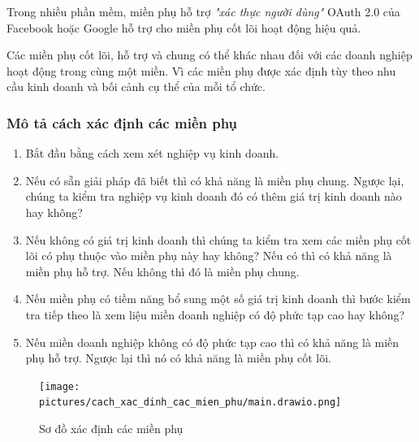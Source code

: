 \begin{example} Trong nhiều phần mềm, miền phụ hỗ trợ \textit{"xác thực người dùng"} OAuth 2.0 của Facebook hoặc Google hỗ trợ cho miền phụ cốt lõi hoạt động hiệu quả.

\end{example}


Các miền phụ cốt lõi, hỗ trợ và chung có thể khác nhau đối với các doanh nghiệp hoạt động trong cùng một miền. Vì các miền phụ được xác định tùy theo nhu cầu kinh doanh và bối cảnh cụ thể của mỗi tổ chức.

\subsubsection{Mô tả cách xác định các miền phụ}

\begin{enumerate}

\item Bắt đầu bằng cách xem xét nghiệp vụ kinh doanh.

\item Nếu có sẵn giải pháp đã biết thì có khả năng là miền phụ chung. Ngược lại, chúng ta kiểm tra nghiệp vụ kinh doanh đó có thêm giá trị kinh doanh nào hay không?

\item Nếu không có giá trị kinh doanh thì chúng ta kiểm tra xem các miền phụ cốt lõi có phụ thuộc vào miền phụ này hay không? Nếu có thì có khả năng là miền phụ hỗ trợ. Nếu không thì đó là miền phụ chung.

\item Nếu miền phụ có tiềm năng bổ sung một số giá trị kinh doanh thì bước kiểm tra tiếp theo là xem liệu miền doanh nghiệp có độ phức tạp cao hay không?

\item Nếu miền doanh nghiệp không có độ phức tạp cao thì có khả năng là miền phụ hỗ trợ. Ngược lại thì nó có khả năng là miền phụ cốt lõi.

\end{enumerate}

\begin{figure}[h]

\centering

\texttt{[image: pictures/cach\_xac\_dinh\_cac\_mien\_phu/main.drawio.png]}

\caption{Sơ đồ xác định các miền phụ}

\end{figure}

